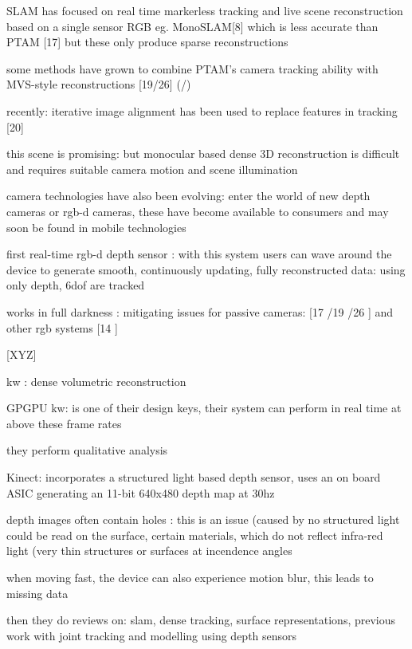SLAM has focused on real time markerless tracking and live scene reconstruction based on a single sensor RGB eg. MonoSLAM[8] \cite{Davison03Real} which is less accurate than PTAM [17] \cite{Klein07Parallel}  but these only produce sparse reconstructions

some methods have grown to combine PTAM's camera tracking ability with MVS-style reconstructions [19/26] (\cite{Newcombe10Live}/\cite{Stuhmer10Real})

recently: iterative image alignment has been used to replace features in tracking [20] \cite{Newcombe11Dtam}

this scene is promising: but monocular based dense 3D reconstruction is difficult and requires suitable camera motion and scene illumination

camera technologies have also been evolving: enter the world of new depth cameras or rgb-d cameras,
these have become available to consumers and may soon be found in mobile technologies \cite{Zhang12Microsoft}

first real-time rgb-d depth sensor : with this system users can wave around the device to generate smooth, continuously updating, fully reconstructed data: using only depth, 6dof are tracked

works in full darkness : mitigating issues for passive cameras: [17 \cite{Klein07Parallel} /19 \cite{Newcombe10Live} /26 \cite{Stuhmer10Real}] and other rgb systems [14 \cite{Henry10Rgb}]

[XYZ]

kw : dense volumetric reconstruction

GPGPU kw: is one of their design keys, their system can perform in real time at above these frame rates

they perform qualitative analysis

Kinect: incorporates a structured light based depth sensor, uses an on board ASIC generating an 11-bit 640x480 depth map at 30hz

depth images often contain holes : this is an issue (caused by no structured light could be read on the surface, certain materials, which do not reflect infra-red light (very thin structures or surfaces at incendence angles

when moving fast, the device can also experience motion blur, this leads to missing data

then they do  reviews on:
	slam, dense tracking, surface representations, previous work with joint tracking and modelling using depth sensors

